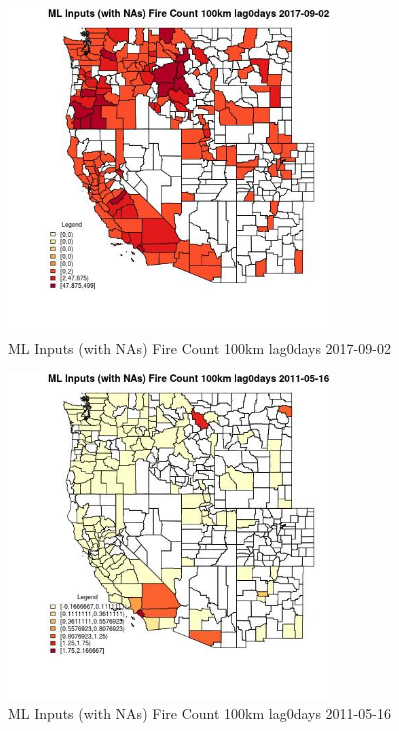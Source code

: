 \begin{figure} 
\centering  
\includegraphics[width=0.77\textwidth]{Code_Outputs/Report_ML_input_PM25_Step4_part_e_de_duplicated_aves_compiled_2019-05-21wNAs_CountyFire_Count_100km_lag0daysMean2017-09-02.jpg} 
\caption{\label{fig:Report_ML_input_PM25_Step4_part_e_de_duplicated_aves_compiled_2019-05-21wNAsCountyFire_Count_100km_lag0daysMean2017-09-02}ML Inputs (with NAs) Fire Count 100km lag0days 2017-09-02} 
\end{figure} 
 

\begin{figure} 
\centering  
\includegraphics[width=0.77\textwidth]{Code_Outputs/Report_ML_input_PM25_Step4_part_e_de_duplicated_aves_compiled_2019-05-21wNAs_CountyFire_Count_100km_lag0daysMean2011-05-16.jpg} 
\caption{\label{fig:Report_ML_input_PM25_Step4_part_e_de_duplicated_aves_compiled_2019-05-21wNAsCountyFire_Count_100km_lag0daysMean2011-05-16}ML Inputs (with NAs) Fire Count 100km lag0days 2011-05-16} 
\end{figure} 
 

